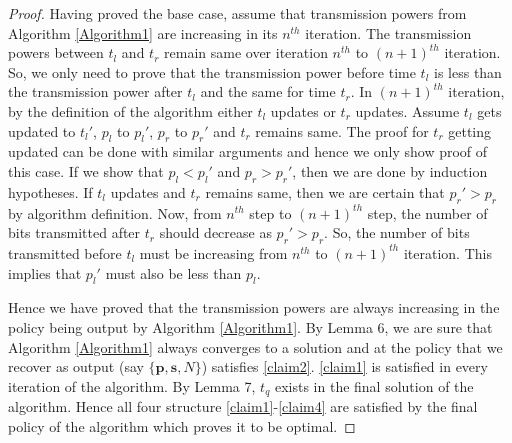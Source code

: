 \begin{proof}
Having proved the base case, assume that transmission powers from Algorithm \ref{Algorithm1} are increasing in its $n^{th}$ iteration. The transmission powers between $t_l$ and $t_r$ remain same over iteration $n^{th}$ to $(n+1)^{th}$ iteration. So, we only need to prove that the transmission power before time $t_l$ is less than the transmission power after $t_l$ and the same for time $t_r$. In $(n+1)^{th}$ iteration, by the definition of the algorithm either $t_l$ updates or $t_{r}$ updates. Assume $t_l$ gets updated to $t_{l}'$, $p_l$ to $p_l'$, $p_r$ to $p_r'$ and $t_r$ remains same. The proof for $t_r$ getting updated can be done with similar arguments and hence we only show proof of this case. If we show that $p_l<p_l'$ and $p_r>p_r'$, then we are done by induction hypotheses. If $t_l$ updates and $t_r$ remains same, then we are certain that $p_{r}'>p_r$ by algorithm definition. Now, from $n^{th}$ step to $(n+1)^{th}$ step, the number of bits transmitted after $t_r$ should decrease as $p_{r}'>p_r$. So, the number of bits transmitted before $t_l$ must be increasing from $n^{th}$ to $(n+1)^{th}$ iteration. This implies that $p_l'$ must also be less than $p_l$.

Hence we have proved that the transmission powers are always increasing in the policy being output by Algorithm \ref{Algorithm1}. By Lemma 6, we are sure that Algorithm \ref{Algorithm1} always converges to a solution and at the policy that we recover as output (say $\{\textbf{p},\textbf{s},N\}$) satisfies \eqref{claim2}. \eqref{claim1} is satisfied in every iteration of the algorithm. By Lemma 7, $t_q$ exists in the final solution of the algorithm. Hence all four structure \eqref{claim1}-\eqref{claim4} are satisfied by the final policy of the algorithm which proves it to be optimal.


\end{proof}

